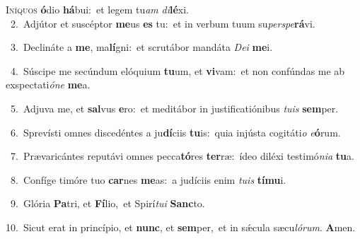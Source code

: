 \lettrine{\initial\textcolor{\initialcolor}{I}}{níquos} \textbf{ó}\-dio \textbf{há}\-bui:~\star et legem tu\textit{am} \textit{di}\-\textbf{lé}xi.\\
{\numbfont\textcolor{\numbcolor}{~2.}}~Adjútor et suscéptor \textbf{me}\-us \textbf{es} tu:~\star et in verbum tuum su\-\textit{per}\-\textit{spe}\textbf{rá}vi.\par
{\numbfont\textcolor{\numbcolor}{~3.}}~Declináte a \textbf{me}\-, ma\-\textbf{lí}\-gni:~\star et scrutábor mandáta \textit{De}\-\textit{i} \textbf{me}\-i.\par
{\numbfont\textcolor{\numbcolor}{~4.}}~Súscipe me secúndum elóquium \textbf{tu}\-um, et \textbf{vi}\-vam:~\star et non confúndas me ab exspectati\-\textit{ó}\-\textit{ne} \textbf{me}\-a.\par
{\numbfont\textcolor{\numbcolor}{~5.}}~Adjuva me, et \textbf{sal}\-vus \textbf{e}\-ro:~\star et meditábor in justificatiónibus \textit{tu}\-\textit{is} \textbf{sem}\-per.\par
{\numbfont\textcolor{\numbcolor}{~6.}}~Sprevísti omnes discedéntes a ju\-\textbf{dí}\-ciis \textbf{tu}\-is:~\star quia injústa cogitáti\textit{o} \textit{e}\-\textbf{ó}rum.\par
{\numbfont\textcolor{\numbcolor}{~7.}}~Prævaricántes reputávi omnes pecca\-\textbf{tó}\-res \textbf{ter}\-ræ:~\star ídeo diléxi testimó\-\textit{ni}\-\textit{a} \textbf{tu}\-a.\par
{\numbfont\textcolor{\numbcolor}{~8.}}~Confíge timóre tuo \textbf{car}\-nes \textbf{me}\-as:~\star a judíciis enim \textit{tu}\-\textit{is} \textbf{tí}\-\textbf{mu}i.\par
{\numbfont\textcolor{\numbcolor}{~9.}}~Glória \textbf{Pa}\-tri, et \textbf{Fí}\-lio,~\star et Spirí\-\textit{tu}\-\textit{i} \textbf{Sanc}\-to.\par
{\numbfont\textcolor{\numbcolor}{10.}}~Sicut erat in princípio, et \textbf{nunc}\-, et \textbf{sem}\-per,~\star et in sǽcula sæcu\-\textit{ló}\-\textit{rum}. \textbf{A}\-men.\par
